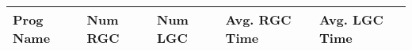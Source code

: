 \documentclass{article}
\begin{document}
\begin{center}
\begin{tabular}
{| l | l | l | l | l |}
\hline
Prog Name & Num RGC & Num LGC & Avg. RGC Time & Avg. LGC Time \\ \hline
\end{tabular}
\end{center}
\end{document}
